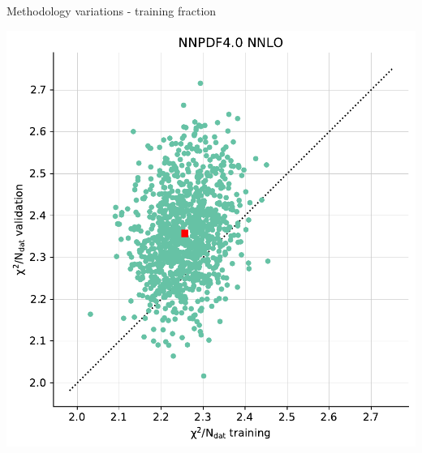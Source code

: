 \documentclass[aspectratio=169,10pt]{beamer}
\begin{document}
\begin{frame}[t]{Methodology variations - training fraction}
\begin{center}
    \includegraphics[height=.5\textheight]{NNPDF40NNLO_plot_training_validation.pdf}
  \end{center}
\end{frame}
\end{document}
